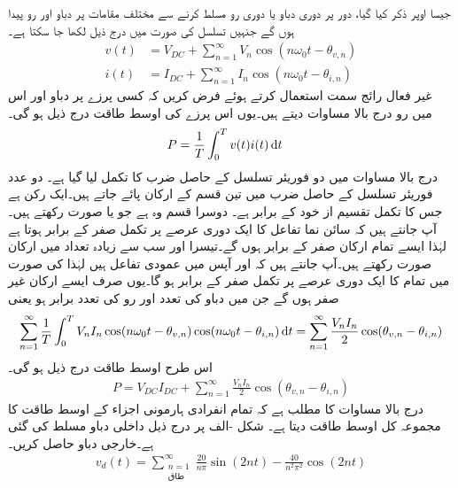 جیسا اوپر ذکر کیا گیا، دور پر دوری دباو یا دوری رو مسلط کرنے سے مختلف مقامات پر دباو اور رو پیدا ہوں گے جنہیں تسلسل کی صورت میں درج ذیل لکھا جا سکتا ہے۔ 
\begin{align}
v(t)&=V_{DC}+\sum_{n=1}^{\infty} V_n \cos (n\omega_0 t-\theta_{v,n})\\
i(t)&=I_{DC}+\sum_{n=1}^{\infty} I_n \cos (n\omega_0 t-\theta_{i,n})
\end{align}
غیر فعال رائج سمت استعمال کرتے ہوئے فرض کریں کہ کسی پرزے پر دباو اور اس میں رو درج بالا مساوات دیتے ہیں۔یوں اس پرزے کی اوسط طاقت درج ذیل ہو گی۔
\begin{align}\label{مساوات_فوریئر_طاقت_الف}
P&=\frac{1}{T}\int_0^T v(t)i(t) \dif t
\end{align}
درج بالا مساوات میں دو فوریئر تسلسل کے حاصل ضرب کا تکمل لیا گیا ہے۔ دو عدد فوریئر تسلسل کے حاصل ضرب  میں تین قسم کے ارکان پائے جاتے ہیں۔ایک رکن  ہے جس کا تکمل تقسیم  از خود  کے برابر ہے۔ دوسرا قسم وہ ہے جو  یا  صورت رکھتے ہیں۔ آپ جانتے ہیں کہ سائن نما تفاعل کا ایک دوری عرصے پر تکمل صفر کے برابر ہوتا ہے لہٰذا ایسے تمام ارکان صفر کے برابر ہوں گے۔تیسرا اور سب سے زیادہ تعداد میں  ارکان  صورت رکھتے ہیں۔آپ جانتے ہیں کہ  اور  آپس میں عمودی تفاعل ہیں لہٰذا  کی صورت میں تمام 
  کا ایک دوری عرصے پر تکمل صفر کے برابر ہو گا۔یوں صرف ایسے ارکان غیر صفر ہوں گے جن میں دباو کی تعدد  اور رو کی تعدد برابر ہو یعنی
\begin{align*}
\sum_{n=1}^{\infty} \frac{1}{T}\int_0^T V_n I_n \cos(n\omega_0 t-\theta_{v,n})\cos(n\omega_0 t-\theta_{i,n}) \dif t=\sum_{n=1}^{\infty} \frac{V_n I_n}{2} \cos(\theta_{v,n}-\theta_{i,n})
\end{align*}
اس طرح اوسط طاقت درج ذیل ہو گی۔
\begin{align}
P=V_{DC}I_{DC}+\sum_{n=1}^{\infty}\frac{ V_n I_n}{2} \cos(\theta_{v,n}-\theta_{i,n})
\end{align}
درج بالا مساوات کا مطلب ہے کہ تمام انفرادی ہارمونی اجزاء کے اوسط طاقت کا مجموعہ کل اوسط طاقت دیتا ہے۔
شکل -الف پر درج ذیل داخلی دباو  مسلط کی گئی ہے۔خارجی دباو  حاصل کریں۔
\begin{align*}
v_d(t)=\sum_{\substack{n=1 \\ \text{طاق}}}^{\infty} \frac{20}{n\pi}\sin (2nt)-\frac{40}{n^2\pi^2}\cos(2nt)
\end{align*}
